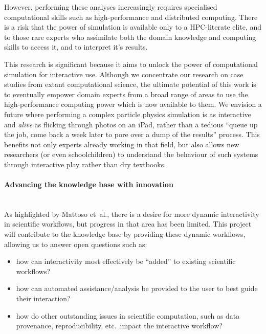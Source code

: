 \documentclass[a4paper,fontsize=12pt]{scrartcl}
\begin{document}
However, performing these analyses increasingly requires specialised
computational skills such as high-performance and distributed
computing. There is a risk that the power of simulation is available
only to a HPC-literate elite, and to those rare experts who assimilate
both the domain knowledge and computing skills to access it, and to
interpret it's results.

This research is significant because it aims to unlock the power of
computational simulation for interactive use. Although we concentrate
our research on case studies from extant computational science, the
ultimate potential of this work is to eventually empower domain
experts from a broad range of areas to use the high-performance
computing power which is now available to them. We envision a future
where performing a complex particle physics simulation is as
interactive and \emph{alive} as flicking through photos on an iPad,
rather than a tedious ``queue up the job, come back a week later to
pore over a dump of the results'' process. This benefits not only
experts already working in that field, but also allows new researchers
(or even schoolchildren) to understand the behaviour of such systems
through interactive play rather than dry textbooks.


\paragraph*{Advancing the knowledge base with innovation}\mbox{}\\

As highlighted by Mattoso et~al.\parencite{Mattoso}, there is a desire for
more dynamic interactivity in scientific workflows, but progress in
that area has been limited. This project will contribute to the
knowledge base by providing these dynamic workflows, allowing us to
answer open questions such as:

\begin{itemize}
\item how can interactivity most effectively be ``added'' to existing
  scientific workflows?
\item how can automated assistance/analysis be provided to the user to
  best guide their interaction?
\item how do other outstanding issues in scientific computation, such
  as data provenance, reproducibility, etc.~impact the interactive
  workflow?
\end{itemize}
\end{document}
